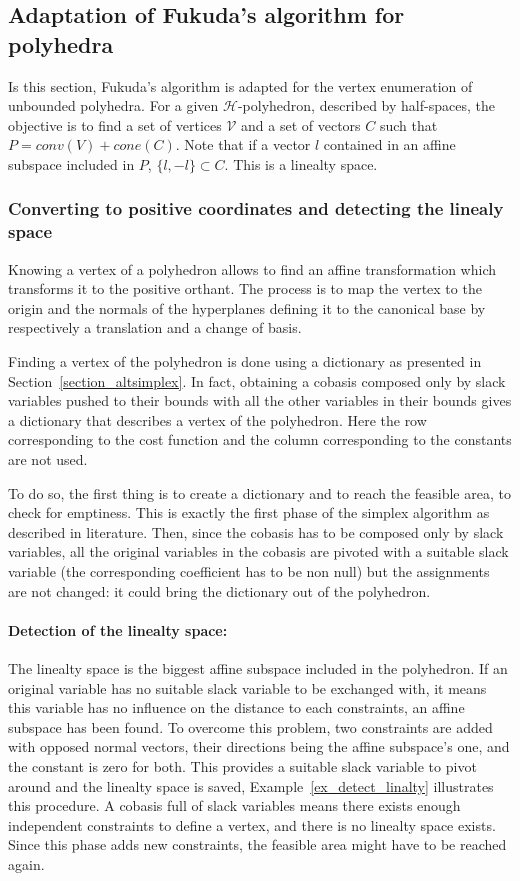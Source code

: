\subsection{Adaptation of Fukuda's algorithm for polyhedra}

Is this section, Fukuda's algorithm is adapted for the vertex enumeration of unbounded polyhedra. For a given $\mathcal{H}$-polyhedron, described by half-spaces, the objective is to find a set of vertices $\mathcal{V}$ and a set of vectors $C$ such that $P = conv(V)+cone(C)$. Note that if a vector $l$ contained in an affine subspace included in $P$, $\{l,-l\}\subset C$. This is a linealty space. 

\subsubsection{Converting to positive coordinates and detecting the linealy space}

Knowing a vertex of a polyhedron allows to find an affine transformation which transforms it to the positive orthant. The process is to map the vertex to the origin and the normals of the hyperplanes defining it to the canonical base by respectively a translation and a change of basis.

Finding a vertex of the polyhedron is done using a dictionary as presented in Section~\ref{section_altsimplex}. In fact, obtaining a cobasis composed only by slack variables pushed to their bounds with all the other variables in their bounds gives a dictionary that describes a vertex of the polyhedron. Here the row corresponding to the cost function and the column corresponding to the constants are not used.


To do so, the first thing is to create a dictionary and to reach the feasible area, to check for emptiness. This is exactly the first phase of the simplex algorithm as described in literature. Then, since the cobasis has to be composed only by slack variables, all the original variables in the cobasis are pivoted with a suitable slack variable (the corresponding coefficient has to be non null) but the assignments are not changed: it could bring the dictionary out of the polyhedron. 


\paragraph*{Detection of the linealty space:} The linealty space is the biggest affine subspace included in the polyhedron. If an original variable has no suitable slack variable to be exchanged with, it means this variable has no influence on the distance to each constraints,  an affine subspace has been found. To overcome this problem, two constraints are added with opposed normal vectors, their directions being the affine subspace's one, and the constant is zero for both. This provides a suitable slack variable to pivot around and the linealty space is saved, Example~\ref{ex_detect_linalty} illustrates this procedure. A cobasis full of slack variables means there exists enough independent constraints to define a vertex, and there is no linealty space exists. Since this phase adds new constraints, the feasible area might have to be reached again.

